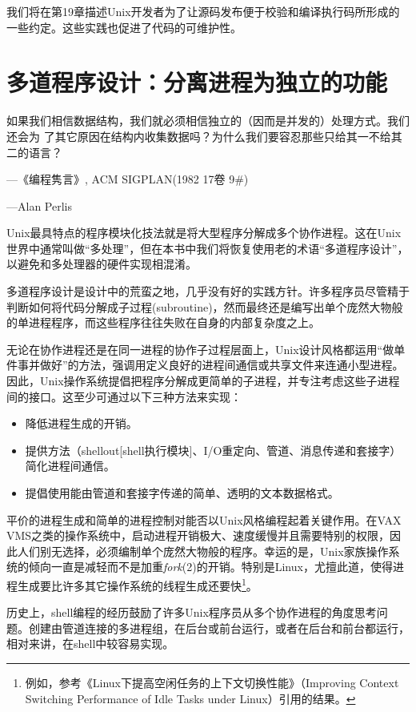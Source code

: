 \documentclass[12pt,oneside]{book}
\begin{document}
我们将在第19章描述Unix开发者为了让源码发布便于校验和编译执行码所形成的一些约定。这些实践也促进了代码的可维护性。


\chapter{多道程序设计：分离进程为独立的功能}
\begin{flushright}
如果我们相信数据结构，我们就必须相信独立的（因而是并发的）处理方式。我们还会为
了其它原因在结构内收集数据吗？为什么我们要容忍那些只给其一不给其二的语言？

{\hfill —《编程隽言》, ACM SIGPLAN(1982 17卷 9\#{})}

{\hfill —Alan Perlis}
\end{flushright}

Unix最具特点的程序模块化技法就是将大型程序分解成多个协作进程。这在Unix世界中通常叫做“多处理”，但在本书中我们将恢复使用老的术语“多道程序设计”，以避免和多处理器的硬件实现相混淆。

多道程序设计是设计中的荒蛮之地，几乎没有好的实践方针。许多程序员尽管精于判断如何将代码分解成子过程(subroutine)，然而最终还是编写出单个庞然大物般的单进程程序，而这些程序往往失败在自身的内部复杂度之上。

无论在协作进程还是在同一进程的协作子过程层面上，Unix设计风格都运用“做单件事并做好”的方法，强调用定义良好的进程间通信或共享文件来连通小型进程。因此，Unix操作系统提倡把程序分解成更简单的子进程，并专注考虑这些子进程间的接口。这至少可通过以下三种方法来实现：
\begin{itemize}
\item 降低进程生成的开销。
\item 提供方法（shellout[shell执行模块]、I/O重定向、管道、消息传递和套接字）简化进程间通信。
\item 提倡使用能由管道和套接字传递的简单、透明的文本数据格式。
\end{itemize}

平价的进程生成和简单的进程控制对能否以Unix风格编程起着关键作用。在VAX VMS之类的操作系统中，启动进程开销极大、速度缓慢并且需要特别的权限，因此人们别无选择，必须编制单个庞然大物般的程序。幸运的是，Unix家族操作系统的倾向一直是减轻而不是加重\textit{fork}(2)的开销。特别是Linux，尤擅此道，使得进程生成要比许多其它操作系统的线程生成还要快\footnote{例如，参考《Linux下提高空闲任务的上下文切换性能》（Improving Context Switching Performance of Idle Tasks under Linux）\cite{Appleton}引用的结果。}。

历史上，shell编程的经历鼓励了许多Unix程序员从多个协作进程的角度思考问题。创建由管道连接的多进程组，在后台或前台运行，或者在后台和前台都运行，相对来讲，在shell中较容易实现。
\end{document}
